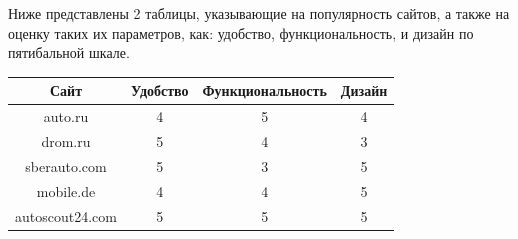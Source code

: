 \noindent
\begin{minipage}{\linewidth}
\end{minipage}
\bigskip

Ниже представлены 2 таблицы, указывающие на популярность сайтов, а также на оценку таких их параметров, как: удобство, функциональность, и дизайн по пятибальной шкале.

\begin{table}[H]
    \centering
    \begin{tabular}{ | c | c | c | c | }
        \hline
        Сайт & Удобство & Функциональность & Дизайн\\
        \hline
        auto.ru & 4 & 5 & 4\\
        \hline
        drom.ru & 5 & 4 & 3\\
        \hline
        sberauto.com & 5 & 3 & 5\\
        \hline
        mobile.de & 4 & 4 & 5\\
        \hline
        autoscout24.com & 5 & 5 & 5\\
        \hline
    \end{tabular}
\end{table}

